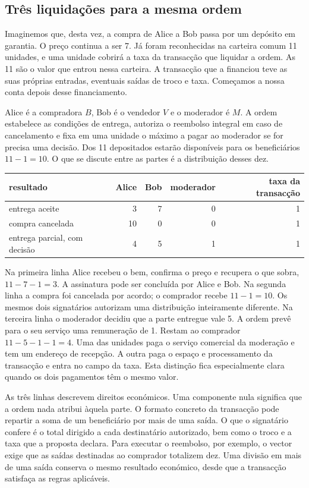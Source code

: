 \subsection{Três liquidações para a mesma ordem}
\label{subsec:garantia-onze}

Imaginemos que, desta vez, a compra de Alice a Bob passa por um depósito
em garantia. O preço continua a ser 7. Já foram reconhecidas na carteira
comum 11 unidades, e uma unidade cobrirá a taxa da transacção que liquidar
a ordem. As 11 são o valor que entrou nessa carteira. A transacção que a
financiou teve as suas próprias entradas, eventuais saídas de troco e taxa.
Começamos a nossa conta depois desse financiamento.

Alice é a compradora \(B\), Bob é o vendedor \(V\) e o moderador é
\(M\). A ordem estabelece as condições de entrega, autoriza o reembolso
integral em caso de cancelamento e fixa em uma unidade o máximo a pagar
ao moderador se for precisa uma decisão. Dos 11 depositados estarão
disponíveis para os beneficiários \(11-1=10\). O que se discute entre
as partes é a distribuição desses dez.

\begin{center}
\begin{tabular}{l|rrr|r}
resultado & Alice & Bob & moderador & taxa da transacção\\
\hline
entrega aceite & 3 & 7 & 0 & 1\\
compra cancelada & 10 & 0 & 0 & 1\\
entrega parcial, com decisão & 4 & 5 & 1 & 1
\end{tabular}
\end{center}

Na primeira linha Alice recebeu o bem, confirma o preço e recupera o que
sobra, \(11-7-1=3\). A assinatura pode ser concluída por Alice e Bob.
Na segunda linha a compra foi cancelada por acordo; o comprador recebe
\(11-1=10\). Os mesmos dois signatários autorizam uma distribuição
inteiramente diferente. Na terceira linha o moderador decidiu que a
parte entregue vale 5. A ordem prevê para o seu serviço uma remuneração
de 1. Restam ao comprador \(11-5-1-1=4\). Uma das unidades paga o
serviço comercial da moderação e tem um endereço de recepção. A outra
paga o espaço e processamento da transacção e entra no campo da taxa.
Esta distinção fica especialmente clara quando os dois pagamentos têm
o mesmo valor.

As três linhas descrevem direitos económicos. Uma componente nula
significa que a ordem nada atribui àquela parte. O formato concreto
da transacção pode repartir a soma de um beneficiário por mais de uma
saída. O que o signatário confere é o total dirigido a cada destinatário
autorizado, bem como o troco e a taxa que a proposta declara. Para
executar o reembolso, por exemplo, o vector exige que as saídas
destinadas ao comprador totalizem dez. Uma divisão em mais de uma
saída conserva o mesmo resultado económico, desde que a transacção
satisfaça as regras aplicáveis.

